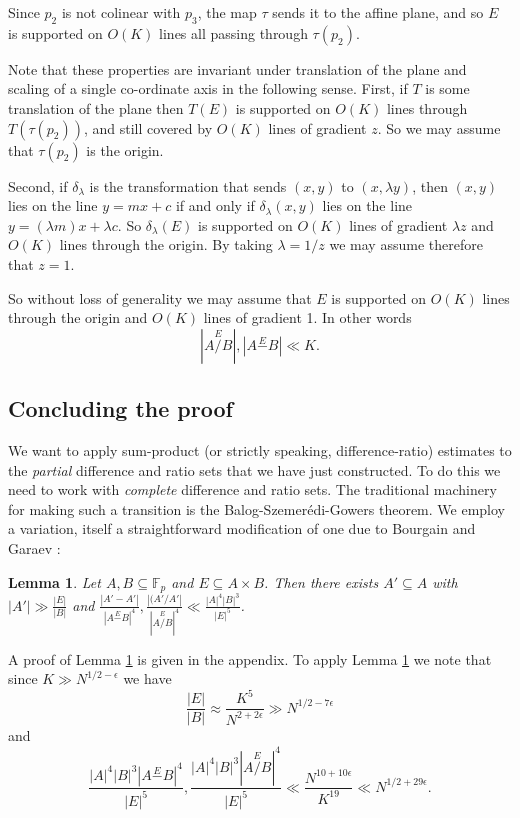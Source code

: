 \documentclass[12pt]{article}
\newtheorem{lemma}[theorem]{Lemma}
\begin{document}
Since $p_2$ is not colinear with $p_3$, the map $\tau$ sends it to the affine plane, and so $E$ is supported on $O(K)$ lines all passing through $\tau(p_2)$.

Note that these properties are invariant under translation of the plane and scaling of a single co-ordinate axis in the following sense. First, if $T$ is some translation of the plane then $T(E)$ is supported on $O(K)$ lines through $T(\tau(p_2))$, and still covered by $O(K)$ lines of gradient $z$. So we may assume that $\tau(p_2)$ is the origin. 

Second, if $\delta_{\lambda}$ is the transformation that sends $(x,y)$ to $(x,\lambda y)$, then $(x,y)$ lies on the line $y=mx+c$ if and only if $\delta_{\lambda}(x,y)$ lies on the line $y=(\lambda m) x+ \lambda c$. So $\delta_{\lambda}(E)$ is supported on $O(K)$ lines of gradient $\lambda z$ and $O(K)$ lines through the origin. By taking $\lambda = 1/z$ we may assume therefore that $z=1$. 

So without loss of generality we may assume that $E$ is supported on $O(K)$ lines through the origin and $O(K)$ lines of gradient 1. In other words
$$\left|A \stackrel{E}{/}B\right|,\left|A \stackrel{E}{-}B\right|\ll K.$$

\subsection{Concluding the proof}

We want to apply sum-product (or strictly speaking, difference-ratio) estimates to the \textit{partial} difference and ratio sets that we have just constructed. To do this we need to work with \textit{complete} difference and ratio sets. The traditional machinery for making such a transition is the Balog-Szemer\'edi-Gowers theorem. We employ a variation, itself a straightforward modification of one due to Bourgain and Garaev \cite{bg}:  

\begin{lemma}\label{theorem:bg}
Let $A,B \subseteq \mathbb{F}_p$ and $E \subseteq A \times B$. Then there exists $A' \subseteq A$ with $|A'|\gg \frac{|E|}{|B|}$ and $\frac{|A'-A'|}{\left|A\stackrel{E}{-}B\right|^4},\frac{|(A'/A'|}{\left|A\stackrel{E}{/}B\right|^4}\ll \frac{|A|^4|B|^3}{|E|^5}$.
\end{lemma}

A proof of Lemma \ref{theorem:bg} is given in the appendix. To apply Lemma \ref{theorem:bg} we note that since $K\gg N^{1/2-\epsilon}$ we have
$$\frac{|E|}{|B|}\approx \frac{K^5}{N^{2+2 \epsilon}}\gg N^{1/2-7 \epsilon}$$
and 
$$\frac{|A|^4|B|^3\left|A\stackrel{E}{-}B\right|^4}{|E|^5}, \frac{|A|^4|B|^3\left|A\stackrel{E}{/}B\right|^4}{|E|^5} \ll \frac{N^{10+10\epsilon}}{K^{19}}  \ll N^{1/2+29 \epsilon}.$$
\end{document}
